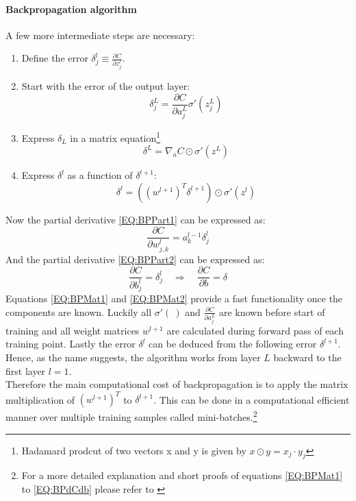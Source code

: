			\paragraph{Backpropagation algorithm}
				A few  more intermediate steps are necessary:
				\begin{enumerate}
					\item Define the error $\delta^l_j \equiv \frac{\partial C}{\partial z^l_j}$.
					\item Start with the error of the output layer: 
					\begin{equation}
						\delta^L_j = \frac{\partial C}{\partial a^L_j}\sigma'\left(z^L_j\right)
						\label{EQ:BPDel}
					\end{equation}
					\item Express $\delta_L$ in a matrix equation\footnote{Hadamard prodcut of two vectors x and y is given by $x \odot y= x_j \cdot y_j$}
					\begin{equation}
						\delta^L = \nabla_a C \odot \sigma'\left(z^L\right)
						\label{EQ:BPMat1}
					\end{equation}
					\item Express $\delta^l$ as a function of $\delta^{l+1}$:
						\begin{equation}
							\delta^l = \left(\left(w^{l+1}\right)^T \delta^{l+1}\right) \odot \sigma'\left(z^l\right)
							\label{EQ:BPMat2}
						\end{equation}
				\end{enumerate}
				Now the partial derivative \ref{EQ:BPPart1} can be expressed as:
				\begin{equation}
					\frac{\partial C}{\partial w^l_{j,k}} = a^{l-1}_k \delta^l_j
					\label{EQ:BPdCdw}
				\end{equation}
				And the partial derivative \ref{EQ:BPPart2} can be expressed as:
				\begin{equation}
					\frac{\partial C}{\partial b^l_j} = \delta^l_j \quad \Rightarrow \quad \frac{\partial C}{\partial b} = \delta
					\label{EQ:BPdCdb}
				\end{equation}
				Equations \ref{EQ:BPMat1} and \ref{EQ:BPMat2} provide a fast functionality once the components are known. Luckily all $\sigma'(\:)$ and $\frac{\partial C}{\partial a^L_j}$ are known before start of training and all weight matrices $w^{l+1}$ are calculated during forward pass of each training point. Lastly the error $\delta^l$ can be deduced from the following error $\delta^{l+1}$. Hence, as the name suggests, the algorithm works from layer $L$ backward to the first layer $l=1$.\\
				Therefore the main computational cost of backpropagation is to apply the matrix multiplication of $\left(w^{l+1}\right)^T$ to $\delta^{l+1}$. This can be done in a computational efficient manner over multiple training samples called mini-batches.\footnote{For a more detailed explanation and short proofs of equations \ref{EQ:BPMat1} to \ref{EQ:BPdCdb} please refer to \cite{NNEBook}}

